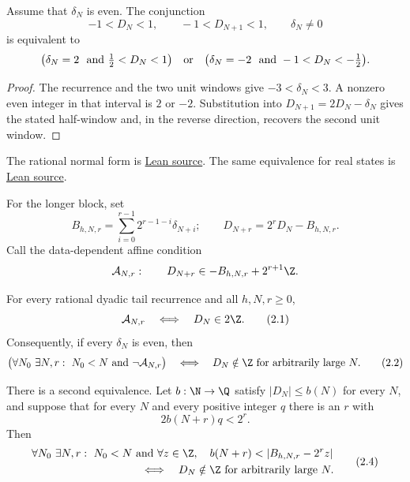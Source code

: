 \documentclass[11pt]{article}
\begin{document}
\begin{theorem}\label{res:signedwindow}
Assume that $\delta_N$ is even.  The conjunction
\[
 -1<D_N<1,\qquad -1<D_{N+1}<1,\qquad \delta_N\ne0
\]
is equivalent to
\[
 \bigl(\delta_N=2\ \hbox{ and }\tfrac12<D_N<1\bigr)
 \quad\hbox{or}\quad
 \bigl(\delta_N=-2\ \hbox{ and }-1<D_N<-\tfrac12\bigr).
\]
\end{theorem}

\begin{proof}
The recurrence and the two unit windows give $-3<\delta_N<3$.  A nonzero even
integer in that interval is $2$ or $-2$.  Substitution into
$D_{N+1}=2D_N-\delta_N$ gives the stated half-window and, in the reverse
direction, recovers the second unit window.
\end{proof}

\noindent The rational normal form is \href{https://github.com/wcook04/plectis-erdos/blob/f36a98bf3d3e6f65f1074e3b800e3293d5b8a51a/ErdosProblems/Erdos251/AffineShiftEscape.lean#L113}{Lean source}.
The same equivalence for real states is
\href{https://github.com/wcook04/plectis-erdos/blob/f36a98bf3d3e6f65f1074e3b800e3293d5b8a51a/ErdosProblems/Erdos251/PaperCoreR7.lean#L135}{Lean source}.

For the longer block, set
\[
 B_{h,N,r}=\sum_{i=0}^{r-1}2^{r-1-i}\delta_{N+i};
 \qquad D_{N+r}=2^rD_N-B_{h,N,r}.
\]
Call the data-dependent affine condition
\[
 \mathcal A_{N,r}:\qquad
 D_{N+r}\in -B_{h,N,r}+2^{r+1}\Z.
\]

\begin{theorem}\label{res:affinecollapse}
For every rational dyadic tail recurrence and all $h,N,r\ge0$,
\[
 \mathcal A_{N,r}\quad\Longleftrightarrow\quad D_N\in2\Z.
\tag{2.1}\label{eq:affinecollapse}
\]
Consequently, if every $\delta_N$ is even, then
\[
 \bigl(\forall N_0\ \exists N,r:\ N_0<N\text{ and }\neg\mathcal A_{N,r}\bigr)
 \quad\Longleftrightarrow\quad
 D_N\notin\Z\text{ for arbitrarily large }N.
\tag{2.2}\label{eq:affinecofinal}
\]

There is a second equivalence.  Let $b:\N\to\Q$ satisfy
$|D_N|\le b(N)$ for every $N$, and suppose that for every $N$ and every
positive integer $q$ there is an $r$ with
\[
 2b(N+r)q<2^r.
\tag{2.3}\label{eq:dyadicscale}
\]
Then
\[
 \begin{split}
 &\forall N_0\ \exists N,r:\ N_0<N\text{ and }
   \forall z\in\Z,\quad
   b(N+r)<|B_{h,N,r}-2^rz|\\
 &\hspace{35mm}\Longleftrightarrow\quad
 D_N\notin\Z\text{ for arbitrarily large }N.
 \end{split}
\tag{2.4}\label{eq:fixedcollapse}
\]
\end{theorem}
\end{document}
